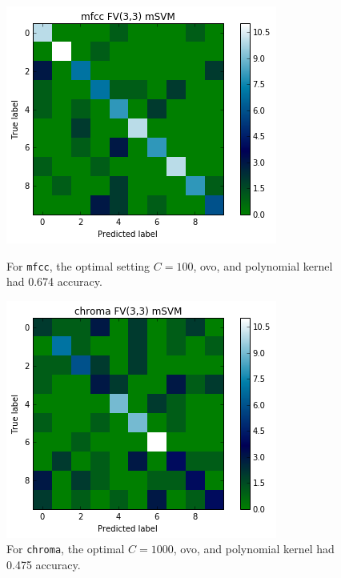 \documentclass{article}
\begin{document}
\begin{figure}[H]
    \centering
    
    \begin{minipage}[b]{0.4\textwidth}
        \includegraphics[width=\textwidth]{msvm-mfcc3-3.png}
        \caption{For \texttt{mfcc}, the optimal setting $C=100$, ovo, and polynomial kernel had 0.674 accuracy.}
    \end{minipage}
    \hfill
    \begin{minipage}[b]{0.4\textwidth}
        \includegraphics[width=\textwidth]{msvm-chroma3-3.png}
        \caption{For \texttt{chroma}, the optimal $C=1000$, ovo, and polynomial kernel had 0.475 accuracy.}
    \end{minipage}
    \label{fig:mSVM}
\end{figure}
\end{document}
